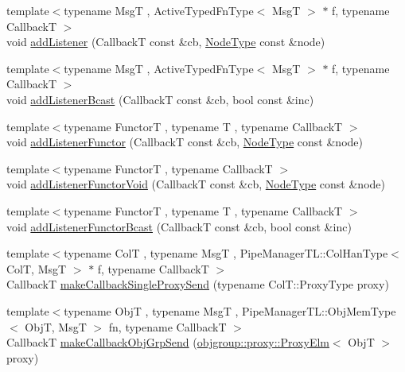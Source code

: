 \begin{DoxyCompactItemize}
\item 
{\footnotesize template$<$typename MsgT , Active\+Typed\+Fn\+Type$<$ Msg\+T $>$ $\ast$ f, typename CallbackT $>$ }\\void \hyperlink{structvt_1_1pipe_1_1_pipe_manager_t_l_ae1aee468ba813cc359e3d3602722b161}{add\+Listener} (CallbackT const \&cb, \hyperlink{namespacevt_a866da9d0efc19c0a1ce79e9e492f47e2}{Node\+Type} const \&node)
\item 
{\footnotesize template$<$typename MsgT , Active\+Typed\+Fn\+Type$<$ Msg\+T $>$ $\ast$ f, typename CallbackT $>$ }\\void \hyperlink{structvt_1_1pipe_1_1_pipe_manager_t_l_a371e41dfb29c097dcf45fa2ae91cbf02}{add\+Listener\+Bcast} (CallbackT const \&cb, bool const \&inc)
\item 
{\footnotesize template$<$typename FunctorT , typename T , typename CallbackT $>$ }\\void \hyperlink{structvt_1_1pipe_1_1_pipe_manager_t_l_aca69c630748b177c01af61b39ffad0ec}{add\+Listener\+Functor} (CallbackT const \&cb, \hyperlink{namespacevt_a866da9d0efc19c0a1ce79e9e492f47e2}{Node\+Type} const \&node)
\item 
{\footnotesize template$<$typename FunctorT , typename CallbackT $>$ }\\void \hyperlink{structvt_1_1pipe_1_1_pipe_manager_t_l_a12039964ec1deb173f0ee83ad4c8a543}{add\+Listener\+Functor\+Void} (CallbackT const \&cb, \hyperlink{namespacevt_a866da9d0efc19c0a1ce79e9e492f47e2}{Node\+Type} const \&node)
\item 
{\footnotesize template$<$typename FunctorT , typename T , typename CallbackT $>$ }\\void \hyperlink{structvt_1_1pipe_1_1_pipe_manager_t_l_a0afd65bacbf65155b3ad095c32aa1038}{add\+Listener\+Functor\+Bcast} (CallbackT const \&cb, bool const \&inc)
\item 
{\footnotesize template$<$typename ColT , typename MsgT , Pipe\+Manager\+T\+L\+::\+Col\+Han\+Type$<$ Col\+T, Msg\+T $>$ $\ast$ f, typename CallbackT $>$ }\\CallbackT \hyperlink{structvt_1_1pipe_1_1_pipe_manager_t_l_a0da1b385495f0a625754f17db45a4066}{make\+Callback\+Single\+Proxy\+Send} (typename Col\+T\+::\+Proxy\+Type proxy)
\item 
{\footnotesize template$<$typename ObjT , typename MsgT , Pipe\+Manager\+T\+L\+::\+Obj\+Mem\+Type$<$ Obj\+T, Msg\+T $>$ fn, typename CallbackT $>$ }\\CallbackT \hyperlink{structvt_1_1pipe_1_1_pipe_manager_t_l_a304681fe59bec2e1ad28a357f48aeab3}{make\+Callback\+Obj\+Grp\+Send} (\hyperlink{structvt_1_1objgroup_1_1proxy_1_1_proxy_elm}{objgroup\+::proxy\+::\+Proxy\+Elm}$<$ ObjT $>$ proxy)

\end{DoxyCompactItemize}
